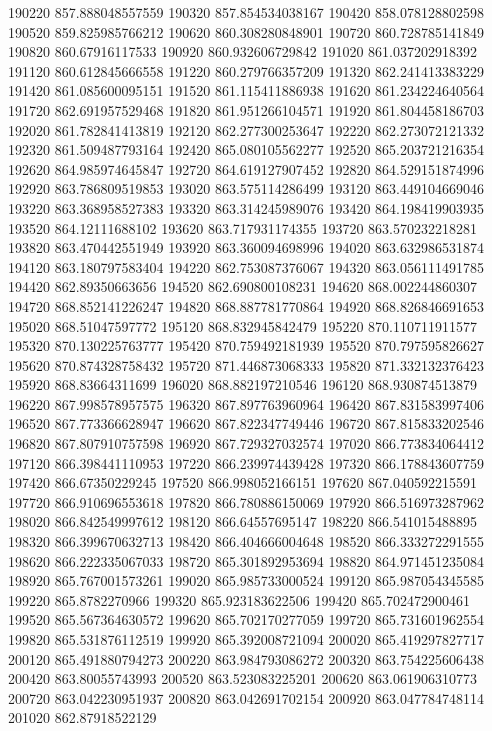 {190220 857.888048557559
190320 857.854534038167
190420 858.078128802598
190520 859.825985766212
190620 860.308280848901
190720 860.728785141849
190820 860.67916117533
190920 860.932606729842
191020 861.037202918392
191120 860.612845666558
191220 860.279766357209
191320 862.241413383229
191420 861.085600095151
191520 861.115411886938
191620 861.234224640564
191720 862.691957529468
191820 861.951266104571
191920 861.804458186703
192020 861.782841413819
192120 862.277300253647
192220 862.273072121332
192320 861.509487793164
192420 865.080105562277
192520 865.203721216354
192620 864.985974645847
192720 864.619127907452
192820 864.529151874996
192920 863.786809519853
193020 863.575114286499
193120 863.449104669046
193220 863.368958527383
193320 863.314245989076
193420 864.198419903935
193520 864.12111688102
193620 863.717931174355
193720 863.570232218281
193820 863.470442551949
193920 863.360094698996
194020 863.632986531874
194120 863.180797583404
194220 862.753087376067
194320 863.056111491785
194420 862.89350663656
194520 862.690800108231
194620 868.002244860307
194720 868.852141226247
194820 868.887781770864
194920 868.826846691653
195020 868.51047597772
195120 868.832945842479
195220 870.110711911577
195320 870.130225763777
195420 870.759492181939
195520 870.797595826627
195620 870.874328758432
195720 871.446873068333
195820 871.332132376423
195920 868.83664311699
196020 868.882197210546
196120 868.930874513879
196220 867.998578957575
196320 867.897763960964
196420 867.831583997406
196520 867.773366628947
196620 867.822347749446
196720 867.815833202546
196820 867.807910757598
196920 867.729327032574
197020 866.773834064412
197120 866.398441110953
197220 866.239974439428
197320 866.178843607759
197420 866.67350229245
197520 866.998052166151
197620 867.040592215591
197720 866.910696553618
197820 866.780886150069
197920 866.516973287962
198020 866.842549997612
198120 866.64557695147
198220 866.541015488895
198320 866.399670632713
198420 866.404666004648
198520 866.333272291555
198620 866.222335067033
198720 865.301892953694
198820 864.971451235084
198920 865.767001573261
199020 865.985733000524
199120 865.987054345585
199220 865.8782270966
199320 865.923183622506
199420 865.702472900461
199520 865.567364630572
199620 865.702170277059
199720 865.731601962554
199820 865.531876112519
199920 865.392008721094
200020 865.419297827717
200120 865.491880794273
200220 863.984793086272
200320 863.754225606438
200420 863.80055743993
200520 863.523083225201
200620 863.061906310773
200720 863.042230951937
200820 863.042691702154
200920 863.047784748114
201020 862.87918522129
}
